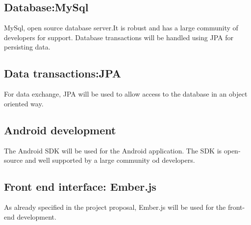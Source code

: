 \documentclass[a4paper,12pt]{article}
\begin{document}
\subsection{Database:MySql}
MySql, open source database server.It is robust and has a large community of developers for support.
Database transactions will be handled using JPA for persisting data.
\subsection{Data transactions:JPA}
For data exchange, JPA will be used to allow access to the database in an object oriented way.
\subsection{Android development}
The Android SDK will be used for the Android application. The SDK is open-source and well supported by a large community od developers.
\subsection{Front end interface: Ember.js}
As already specified in the project proposal, Ember.js will be used for the front-end development.
\end{document}
